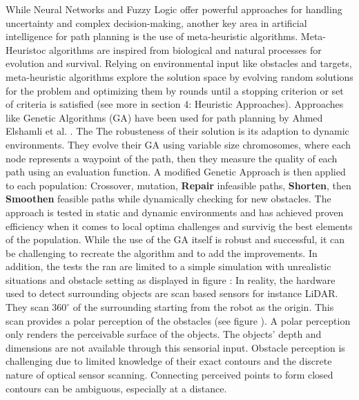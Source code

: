 While Neural Networks and Fuzzy Logic offer powerful approaches for handling uncertainty and complex decision-making, 
another key area in artificial intelligence for path planning is the use of meta-heuristic algorithms.
Meta-Heuristoc algorithms are inspired from biological and natural processes for evolution and survival. 
Relying on environmental input like obstacles and targets, meta-heuristic algorithms explore the solution
space by evolving random solutions for the problem and optimizing them by rounds until a stopping criterion or set
of criteria is satisfied (see more in section 4: Heuristic Approaches).
Approaches like Genetic Algorithms (GA) have been used for path planning by Ahmed Elshamli et al. \cite{R17}. The The robusteness of their 
solution is its adaption to dynamic environments. They evolve their GA using variable size chromosomes, where each node 
represents a waypoint of the path, then they measure the quality of each path using an evaluation function. A modified Genetic Approach is then 
applied to each population: Crossover, mutation, \textbf{Repair} infeasible paths, \textbf{Shorten}, then \textbf{Smoothen} 
feasible paths while dynamically checking for new obstacles.
The approach is tested in static and dynamic environments and has achieved proven efficiency when it comes 
to local optima challenges and survivig the best elements of the population. While the use of the GA itself is robust
and successful, it can be challenging to recreate the algorithm and to add the improvements. In addition, the tests
the ran are limited to a simple simulation with unrealistic situations and obstacle setting as displayed in 
figure : In reality, the hardware used to detect surrounding objects are scan based sensors
for instance LiDAR. They scan \(360^{\circ}\) of the surrounding starting from the robot as the origin.
This scan provides a polar perception of the obstacles (see figure ). 
A polar perception only renders the perceivable surface of the objects.
The objects' depth and dimensions are not available through this sensorial input.
Obstacle perception is challenging due to limited knowledge of their exact contours and the 
discrete nature of optical sensor scanning. Connecting perceived points to form closed contours can 
be ambiguous, especially at a distance.

